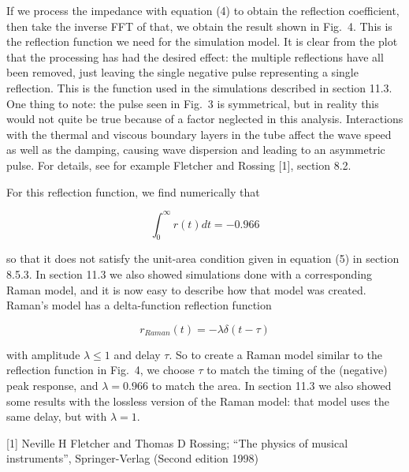 
  If we process the impedance with equation (4) to obtain the reflection 
  coefficient, then take the inverse FFT of that, we obtain the result shown in 
  Fig.\ 4. This is the reflection function we need for the simulation model. It 
  is clear from the plot that the processing has had the desired effect: the 
  multiple reflections have all been removed, just leaving the single negative 
  pulse representing a single reflection. This is the function used in the 
  simulations described in section 11.3. One thing to note: the pulse seen in 
  Fig.\ 3 is symmetrical, but in reality this would not quite be true because 
  of a factor neglected in this analysis. Interactions with the thermal and 
  viscous boundary layers in the tube affect the wave speed as well as the 
  damping, causing wave dispersion and leading to an asymmetric pulse. For 
  details, see for example Fletcher and Rossing [1], section 8.2. 


  For this reflection function, we find numerically that 

  $$\int_0^\infty{r(t) dt}=-0.966$$ 

  so that it does not satisfy the unit-area condition given in equation (5) in 
  section 8.5.3. In section 11.3 we also showed simulations done with a 
  corresponding Raman model, and it is now easy to describe how that model was 
  created. Raman's model has a delta-function reflection function 

  $$r_{Raman}(t)=-\lambda \delta(t-\tau)$$ 

  with amplitude $\lambda \le 1$ and delay $\tau$. So to create a Raman model 
  similar to the reflection function in Fig.\ 4, we choose $\tau$ to match the 
  timing of the (negative) peak response, and $\lambda=0.966$ to match the 
  area. In section 11.3 we also showed some results with the lossless version 
  of the Raman model: that model uses the same delay, but with $\lambda=1$. 

  \sectionreferences{}[1] Neville H Fletcher and Thomas D Rossing; “The physics 
  of musical instruments”, Springer-Verlag (Second edition 1998) 
